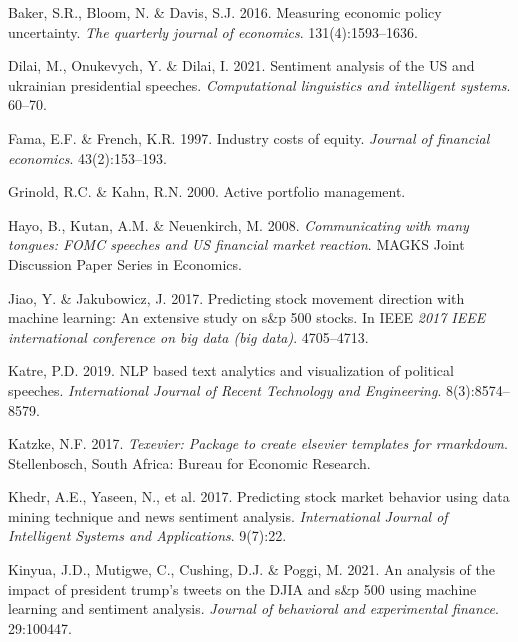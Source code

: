 \documentclass[11pt,preprint, authoryear]{elsarticle}
\numberwithin{equation}{section}
\numberwithin{figure}{section}
\numberwithin{table}{section}
\newlength{\cslhangindent}
\newenvironment{CSLReferences}%
  {\setlength{\parindent}{0pt}%
  \everypar{\setlength{\hangindent}{\cslhangindent}}\ignorespaces}%
  {\par}
\begin{document}
\hypertarget{refs}{}
\begin{CSLReferences}{1}{0}
\leavevmode{}%
Baker, S.R., Bloom, N. \& Davis, S.J. 2016. Measuring economic policy
uncertainty. \emph{The quarterly journal of economics}.
131(4):1593--1636.

\leavevmode{}%
Dilai, M., Onukevych, Y. \& Dilai, I. 2021. Sentiment analysis of the US
and ukrainian presidential speeches. \emph{Computational linguistics and
intelligent systems}. 60--70.

\leavevmode{}%
Fama, E.F. \& French, K.R. 1997. Industry costs of equity. \emph{Journal
of financial economics}. 43(2):153--193.

\leavevmode{}%
Grinold, R.C. \& Kahn, R.N. 2000. Active portfolio management.

\leavevmode{}%
Hayo, B., Kutan, A.M. \& Neuenkirch, M. 2008. \emph{Communicating with
many tongues: FOMC speeches and US financial market reaction}. MAGKS
Joint Discussion Paper Series in Economics.

\leavevmode{}%
Jiao, Y. \& Jakubowicz, J. 2017. Predicting stock movement direction
with machine learning: An extensive study on s\&p 500 stocks. In IEEE
\emph{2017 IEEE international conference on big data (big data)}.
4705--4713.

\leavevmode{}%
Katre, P.D. 2019. NLP based text analytics and visualization of
political speeches. \emph{International Journal of Recent Technology and
Engineering}. 8(3):8574--8579.

\leavevmode{}%
Katzke, N.F. 2017. \emph{{Texevier}: {P}ackage to create elsevier
templates for rmarkdown}. Stellenbosch, South Africa: Bureau for
Economic Research.

\leavevmode{}%
Khedr, A.E., Yaseen, N., et al. 2017. Predicting stock market behavior
using data mining technique and news sentiment analysis.
\emph{International Journal of Intelligent Systems and Applications}.
9(7):22.

\leavevmode{}%
Kinyua, J.D., Mutigwe, C., Cushing, D.J. \& Poggi, M. 2021. An analysis
of the impact of president trump's tweets on the DJIA and s\&p 500 using
machine learning and sentiment analysis. \emph{Journal of behavioral and
experimental finance}. 29:100447.


\end{CSLReferences}
\end{document}
